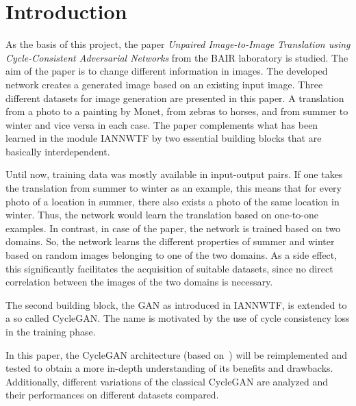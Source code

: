 \documentclass[fleqn,10pt]{SelfArx} %
\begin{document}
\maketitle
\tableofcontents
\thispagestyle{empty} %


\section*{Introduction}
As the basis of this project, the paper \textit{Unpaired Image-to-Image Translation using Cycle-Consistent Adversarial Networks} from the \ac{BAIR} laboratory is studied. The aim of the paper is to change different information in images. The developed network creates a generated image based on an existing input image. Three different datasets for image generation are presented in this paper. A translation from a photo to a painting by Monet, from zebras to horses, and from summer to winter and vice versa in each case. The paper complements what has been learned in the module \ac{IANNWTF} by two essential building blocks that are basically interdependent.~\cite{image-to-image-ccan}

Until now, training data was mostly available in input-output pairs. If one takes the translation from summer to winter as an example, this means that for every photo of a location in summer, there also exists a photo of the same location in winter. Thus, the network would learn the translation based on one-to-one examples. In contrast, in case of the paper, the network is trained based on two domains. So, the network learns the different properties of summer and winter based on random images belonging to one of the two domains. As a side effect, this significantly facilitates the acquisition of suitable datasets, since no direct correlation between the images of the two domains is necessary.~\cite{image-to-image-ccan}

The second building block, the \ac{GAN} as introduced in \ac{IANNWTF}, is extended to a so called Cycle\ac{GAN}. The name is motivated by the use of cycle consistency loss in the training phase.

In this paper, the Cycle\ac{GAN} architecture (based on~\cite{image-to-image-ccan}) will be reimplemented and tested to obtain a more in-depth understanding of its benefits and drawbacks. Additionally, different variations of the classical Cycle\ac{GAN} are analyzed and their performances on different datasets compared.
\end{document}
